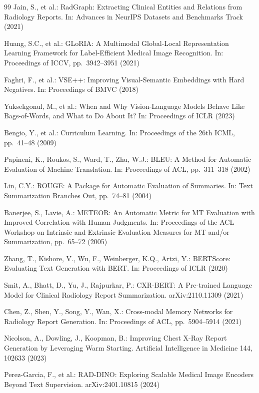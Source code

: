 \documentclass[runningheads]{llncs}
\begin{document}
\begin{thebibliography}{99}
Jain, S., et al.: RadGraph: Extracting Clinical Entities and Relations
from Radiology Reports.
In: Advances in NeurIPS Datasets and Benchmarks Track (2021)

Huang, S.C., et al.: GLoRIA: A Multimodal Global-Local Representation
Learning Framework for Label-Efficient Medical Image Recognition.
In: Proceedings of ICCV, pp.~3942--3951 (2021)

Faghri, F., et al.: VSE++: Improving Visual-Semantic Embeddings with
Hard Negatives.
In: Proceedings of BMVC (2018)

Yuksekgonul, M., et al.: When and Why Vision-Language Models Behave
Like Bags-of-Words, and What to Do About It?
In: Proceedings of ICLR (2023)

Bengio, Y., et al.: Curriculum Learning.
In: Proceedings of the 26th ICML, pp.~41--48 (2009)

Papineni, K., Roukos, S., Ward, T., Zhu, W.J.: BLEU: A Method for
Automatic Evaluation of Machine Translation.
In: Proceedings of ACL, pp.~311--318 (2002)

Lin, C.Y.: ROUGE: A Package for Automatic Evaluation of Summaries.
In: Text Summarization Branches Out, pp.~74--81 (2004)

Banerjee, S., Lavie, A.: METEOR: An Automatic Metric for MT Evaluation
with Improved Correlation with Human Judgments.
In: Proceedings of the ACL Workshop on Intrinsic and Extrinsic
Evaluation Measures for MT and/or Summarization, pp.~65--72 (2005)

Zhang, T., Kishore, V., Wu, F., Weinberger, K.Q., Artzi, Y.:
BERTScore: Evaluating Text Generation with BERT.
In: Proceedings of ICLR (2020)

Smit, A., Bhatt, D., Yu, J., Rajpurkar, P.:
CXR-BERT: A Pre-trained Language Model for Clinical Radiology Report
Summarization.
arXiv:2110.11309 (2021)

Chen, Z., Shen, Y., Song, Y., Wan, X.:
Cross-modal Memory Networks for Radiology Report Generation.
In: Proceedings of ACL, pp.~5904--5914 (2021)

Nicolson, A., Dowling, J., Koopman, B.:
Improving Chest X-Ray Report Generation by Leveraging Warm Starting.
Artificial Intelligence in Medicine 144, 102633 (2023)

Perez-Garcia, F., et al.: RAD-DINO: Exploring Scalable Medical Image
Encoders Beyond Text Supervision.
arXiv:2401.10815 (2024)


\end{thebibliography}
\end{document}

